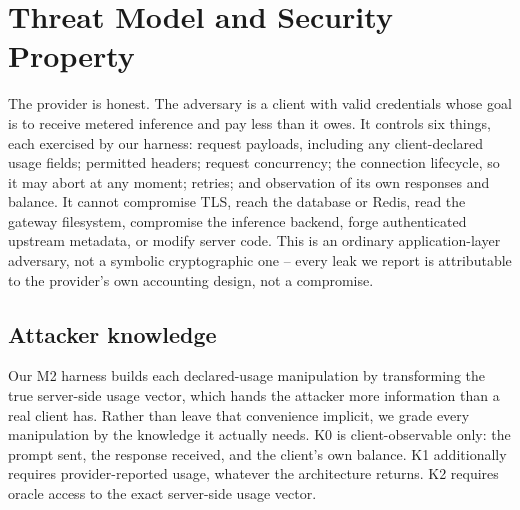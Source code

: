 \documentclass[manuscript,review]{acmart}
\begin{document}
\begin{table}[t]
\caption{Adversary directions in LLM inference accounting. Prior work covers the first
three rows; this paper studies the fourth.}
\label{tab:quadrant}
\centering
{}
\end{table}

\section{Threat Model and Security Property}
\label{sec:threat}
The provider is honest. The adversary is a client with valid credentials whose goal is to
receive metered inference and pay less than it owes. It controls six things, each
exercised by our harness: request payloads, including any client-declared usage fields;
permitted headers; request concurrency; the connection lifecycle, so it may abort at any
moment; retries; and observation of its own responses and balance. It cannot compromise
TLS, reach the database or Redis, read the gateway filesystem, compromise the inference
backend, forge authenticated upstream metadata, or modify server code. This is an
ordinary application-layer adversary, not a symbolic cryptographic one -- every leak we
report is attributable to the provider's own accounting design, not a compromise.

\subsection{Attacker knowledge}
Our M2 harness builds each declared-usage manipulation by transforming the true
server-side usage vector, which hands the attacker more information than a real client
has. Rather than leave that convenience implicit, we grade every manipulation by the
knowledge it actually needs. K0 is client-observable only: the prompt sent, the response
received, and the client's own balance. K1 additionally requires provider-reported usage,
whatever the architecture returns. K2 requires oracle access to the exact server-side
usage vector.
\end{document}
